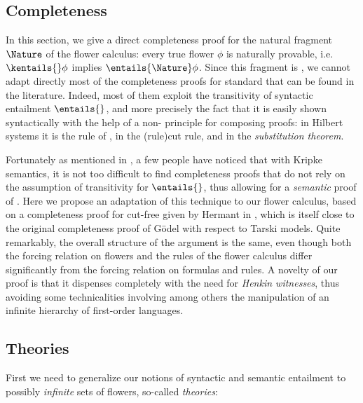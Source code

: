 \begin{scope}
\section{Completeness}

In this section, we give a direct completeness proof for the natural fragment
$\Nature$ of the flower calculus: every true flower $\phi$ is naturally
provable, i.e. $\kentails{}\phi$ implies $\entails{\Nature} \phi$. Since this
fragment is , we cannot adapt directly most of the completeness proofs
for standard  that can be found in the literature. Indeed, most of
them exploit the transitivity of syntactic entailment $\entails{}$, and more
precisely the fact that it is easily shown syntactically with the help of a
non- principle for composing proofs: in Hilbert systems it is the rule
of  , in  the \kl(rule){cut} rule, and
in  the \emph{substitution theorem}.

Fortunately as mentioned in , a few people have noticed that
with Kripke semantics, it is not too difficult to find completeness proofs that
do not rely on the assumption of transitivity for $\entails{}$, thus allowing
for a \emph{semantic} proof of . Here we propose an adaptation of
this technique to our flower calculus, based on a completeness proof for
cut-free  given by Hermant in
, which is itself close to the original
completeness proof of Gödel with respect to  Tarski models. Quite
remarkably, the overall structure of the argument is the same, even though both
the forcing relation on flowers and the rules of the flower calculus differ
significantly from the forcing relation on formulas and  rules.
A novelty of our proof is that it dispenses completely with the need for
\emph{Henkin witnesses}, thus avoiding some technicalities involving among
others the manipulation of an infinite hierarchy of first-order languages.

\subsection{Theories}

First we need to generalize our notions of syntactic and semantic entailment to
possibly \emph{infinite} sets of flowers, so-called \emph{theories}:

\begin{definition}[Theory] 
  

\end{definition}
\end{scope}
